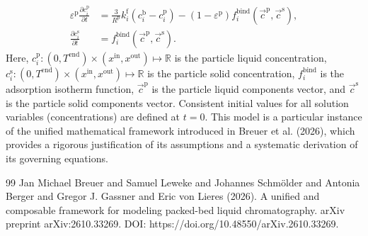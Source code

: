 \documentclass{article}
\begin{document}
\begin{align}
    \varepsilon^{\mathrm{p}}\frac{\partial c^{\mathrm{p}}_{i}}{\partial t}
    &= \frac{3}{R^{\mathrm{p}}} k^{\mathrm{f}}_{i} \left( c^{\mathrm{b}}_{i} - c^{\mathrm{p}}_{i} \right)
        - \left( 1 - \varepsilon^{\mathrm{p}} \right) f^{\mathrm{bind}}_{i}\left( \vec{c}^{\mathrm{p}}, \vec{c}^{\mathrm{s}} \right),
    \\
    \frac{\partial c^{\mathrm{s}}_{i}}{\partial t}
    &= f^{\mathrm{bind}}_{i}\left( \vec{c}^{\mathrm{p}}, \vec{c}^{\mathrm{s}} \right).
\end{align}
Here, $c^{\mathrm{p}}_{i}\colon (0, T^{\mathrm{end}}) \times (x^{\mathrm{in}}, x^{\mathrm{out}}) \mapsto \mathbb{R}$ is the particle liquid concentration, $c^{\mathrm{s}}_{i}\colon (0, T^{\mathrm{end}}) \times (x^{\mathrm{in}}, x^{\mathrm{out}}) \mapsto \mathbb{R}$ is the particle solid concentration, $f^{\mathrm{bind}}_{i}$ is the adsorption isotherm function, $\vec{c}^{\mathrm{p}}$ is the particle liquid components vector, and $\vec{c}^{\mathrm{s}}$ is the particle solid components vector.
Consistent initial values for all solution variables (concentrations) are defined at $t = 0$.
This model is a particular instance of the unified mathematical framework introduced in Breuer et al. (2026), which provides a rigorous justification of its assumptions and a systematic derivation of its governing equations.
\begin{thebibliography}{99}
     Jan Michael Breuer and Samuel Leweke and Johannes Schmölder and Antonia Berger and Gregor J. Gassner and Eric von Lieres (2026). A unified and composable framework for modeling packed-bed liquid chromatography. arXiv preprint arXiv:2610.33269. DOI: https://doi.org/10.48550/arXiv.2610.33269.
\end{thebibliography}
\end{document}
